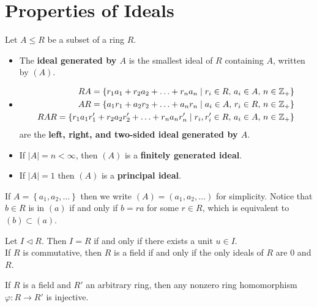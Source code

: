 \documentclass{memoir}
\begin{document}


\section{Properties of Ideals}
\label{sec:properties_of_ideals}

\begin{defn}
	Let \(A\leq R\) be a subset of a ring \(R\).
	\begin{itemize}
		\item  The \textbf{ideal generated by \(A\)} is the  smallest ideal of \(R\) containing \(A\), written by \((A)\).
		\item 
			\begin{align*}
				RA = \left\{r_1a_1 + r_2a_2 + \ldots + r_na_n \mid r_i \in R,\, a_i \in A,\, n \in \mathbb{Z}_+ \right\} \\
				AR = \left\{a_1r_1 + a_2r_2 + \ldots + a_nr_n \mid a_i \in A,\,r_i \in R,\,  n \in \mathbb{Z}_+ \right\} \\
				RAR = \left\{r_1a_1r'_1 + r_2a_2r_2' + \ldots + r_na_nr_n' \mid r_i,r'_i \in R,\, a_i \in A,\, n \in \mathbb{Z}_+ \right\}
			\end{align*}
			are the \textbf{left, right, and two-sided ideal generated by \(A\)}.
		\item If \(\left| A \right| = n < \infty\), then \((A)\) is a \textbf{finitely generated ideal}.
		\item If \(\left| A \right| =1\) then \((A)\) is a \textbf{principal ideal}.
	\end{itemize}
\end{defn}
If \(A = \left\{ a_1,a_2,\ldots \right\} \) then we write \((A) = (a_1,a_2,\ldots)\) for simplicity. Notice that \(b\in R\) is in \((a)\) if and only if \(b = ra\) for some \(r \in R\), which is equivalent to \((b) \subset (a)\).

\begin{prop}
	Let \(I \triangleleft R\). Then \(I = R\) if and only if there exists a unit \(u \in I\).\\

	If \(R\) is commutative, then \(R\) is a field if and only if the only ideals of \(R\) are \(0\) and \(R\).
\end{prop}

\begin{cor}
	If \(R\) is a field and \(R'\) an arbitrary ring, then any nonzero ring homomorphism \(\varphi :R\to R'\) is injective.
\end{cor}
\end{document}
